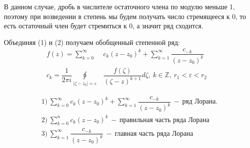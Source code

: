 В данном случае, дробь в числителе остаточного члена по модулю меньше 1, поэтому при возведении в степень мы будем получать число стремящееся к 0, то есть остаточный член будет стремиться к 0, а значит ряд сходится.

Объединяя (1) и (2) получаем обобщенный степенной ряд:
\begin{align}
    f(z)=\sum\limits_{k=0}^{\infty}&c_k(z-z_0)^{k} + \sum\limits_{k=1}^\infty \dfrac{c_{-k}}{(z-z_0)^k} 
    \\
    c_k=\dfrac{1}{2\pi i}\oint\limits_{|\zeta-z_0|=\varepsilon}&\dfrac{f(\zeta)}{(\zeta-z)^{k+1}}d\zeta,\ k\in\mathbb{Z},\ r_1<\varepsilon<r_2
\end{align}

\begin{definition*}
\begin{align}
    &1)\ \sum\limits_{k=0}^{\infty}c_k(z-z_0)^k+\sum\limits_{k=1}^\infty \dfrac{c_{-k}}{(z-z_0)^k}~-~\text{ряд Лорана}.
    \\
    &2)\ \sum\limits_{k=0}^{n}c_k(z-z_0)^k~-~\text{правильная часть ряда Лорана}
    \\
    &3)\ \sum\limits_{k=1}^\infty \dfrac{c_{-k}}{(z-z_0)^k}~-~\text{главная часть ряда Лорана}
\end{align}
\end{definition*}


